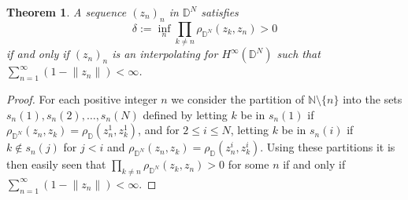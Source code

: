\documentclass[preprint,12pt,number]{elsarticle}
\newtheorem{theorem}{Theorem}[section]
\newcommand{\N}{\mathbb{N}}
\newcommand{\C}{\mathbb{C}}
\newcommand{\D}{\mathbb{D}}
\begin{document}


\begin{theorem}
    A sequence $(z_n)_n$ in $\D^N$ satisfies 
    \[
    \delta:=\inf_n \prod_{k\neq n}\rho_{\D^N}(z_k,z_n)>0
    \]
    if and only if $(z_n)_n$ is an interpolating for $H^\infty(\D^N)$ such that $\sum_{n=1}^\infty(1-\lVert z_n\rVert)<\infty$.
\end{theorem}

\begin{proof}
For each positive integer $n$ we consider the partition of $\N\setminus\{n\}$ into the sets $s_n(1), s_n(2), \dots, s_n(N)$ defined by letting $k$ be in $s_n(1)$ if $\rho_{\D^N}(z_n,z_k)=\rho_{\D}(z_n^1,z_k^1)$, and for $2\leq i\leq N$, letting $k$ be in $s_n(i)$ if $k\notin s_n(j)$ for $j<i$ and $\rho_{\D^N}(z_n,z_k)=\rho_{\D}(z_n^i,z_k^i)$. Using these partitions it is then easily seen that $\prod_{k\neq n}\rho_{\D^N}(z_k,z_n)>0$ for some $n$ if and only if $\sum_{n=1}^\infty(1-\lVert z_n\rVert)<\infty$. 


\end{proof}
\end{document}
